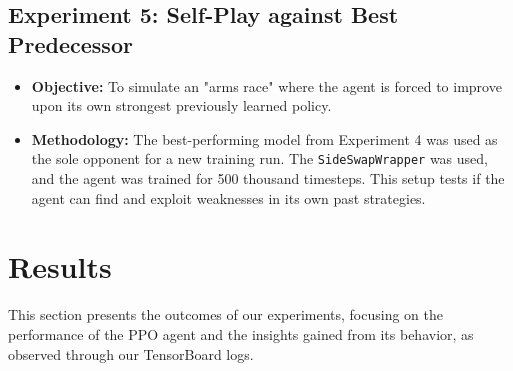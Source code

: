 \documentclass[conference]{IEEEtran}
\begin{document}
\subsection{Experiment 5: Self-Play against Best Predecessor}
\begin{itemize}
    \item \textbf{Objective:} To simulate an "arms race" where the agent is forced to improve upon its own strongest previously learned policy.
    \item \textbf{Methodology:} The best-performing model from Experiment 4 was used as the sole opponent for a new training run. The \texttt{SideSwapWrapper} was used, and the agent was trained for 500 thousand timesteps. This setup tests if the agent can find and exploit weaknesses in its own past strategies.
\end{itemize}

\section{Results}
This section presents the outcomes of our experiments, focusing on the performance of the PPO agent and the insights gained from its behavior, as observed through our TensorBoard logs.
\end{document}
